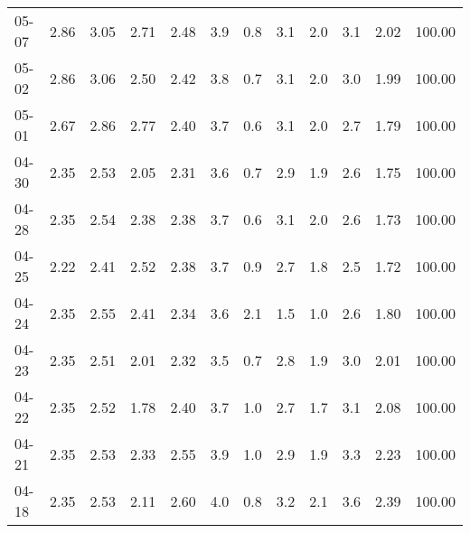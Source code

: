 \begin{threeparttable}
{\begin{tabular}{lrrrrrrrrrrr}
  05-07 &          2.86 &          3.05 &          2.71 &        2.48 &                 3.9 &                 0.8 &        3.1 &                 2.0 &              3.1 &            2.02 &                 100.00 \\
  05-02 &          2.86 &          3.06 &          2.50 &        2.42 &                 3.8 &                 0.7 &        3.1 &                 2.0 &              3.0 &            1.99 &                 100.00 \\
  05-01 &          2.67 &          2.86 &          2.77 &        2.40 &                 3.7 &                 0.6 &        3.1 &                 2.0 &              2.7 &            1.79 &                 100.00 \\
  04-30 &          2.35 &          2.53 &          2.05 &        2.31 &                 3.6 &                 0.7 &        2.9 &                 1.9 &              2.6 &            1.75 &                 100.00 \\
  04-28 &          2.35 &          2.54 &          2.38 &        2.38 &                 3.7 &                 0.6 &        3.1 &                 2.0 &              2.6 &            1.73 &                 100.00 \\
  04-25 &          2.22 &          2.41 &          2.52 &        2.38 &                 3.7 &                 0.9 &        2.7 &                 1.8 &              2.5 &            1.72 &                 100.00 \\
  04-24 &          2.35 &          2.55 &          2.41 &        2.34 &                 3.6 &                 2.1 &        1.5 &                 1.0 &              2.6 &            1.80 &                 100.00 \\
  04-23 &          2.35 &          2.51 &          2.01 &        2.32 &                 3.5 &                 0.7 &        2.8 &                 1.9 &              3.0 &            2.01 &                 100.00 \\
  04-22 &          2.35 &          2.52 &          1.78 &        2.40 &                 3.7 &                 1.0 &        2.7 &                 1.7 &              3.1 &            2.08 &                 100.00 \\
  04-21 &          2.35 &          2.53 &          2.33 &        2.55 &                 3.9 &                 1.0 &        2.9 &                 1.9 &              3.3 &            2.23 &                 100.00 \\
  04-18 &          2.35 &          2.53 &          2.11 &        2.60 &                 4.0 &                 0.8 &        3.2 &                 2.1 &              3.6 &            2.39 &                 100.00 \\

\end{tabular}}
\end{threeparttable}

